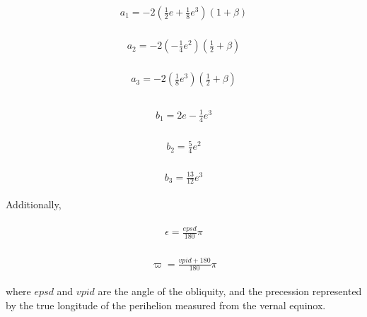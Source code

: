 \begin{eqnarray}
\begin{array}{l}
a_{1}=-2\left(\frac{1}{2} e+\frac{1}{8} e^{3}\right)(1+\beta)
\end{array}
\end{eqnarray}

\begin{eqnarray}
\begin{array}{l}
a_{2}=-2\left(-\frac{1}{4} e^{2}\right)\left(\frac{1}{2}+\beta\right)
\end{array}
\end{eqnarray}

\begin{eqnarray}
\begin{array}{l}
a_{3}=-2\left(\frac{1}{8} e^{3}\right)\left(\frac{1}{2}+\beta\right) \\
\end{array}
\end{eqnarray}

\begin{eqnarray}
\begin{array}{l}
b_{1}=2 e-\frac{1}{4} e^{3}
\end{array}
\end{eqnarray}

\begin{eqnarray}
\begin{array}{l}
b_{2}=\frac{5}{4} e^{2}
\end{array}
\end{eqnarray}

\begin{eqnarray}
\begin{array}{l}
b_{3}=\frac{13}{12} e^{3}
\end{array}
\end{eqnarray}

Additionally,

\begin{eqnarray}
\begin{array}{l}
\epsilon=\frac{e p s d}{180} \pi
\end{array}
\end{eqnarray}

\begin{eqnarray}
\begin{array}{l}
\varpi=\frac{v p i d+180}{180} \pi
\end{array}
\end{eqnarray}

where \(epsd\) and \(vpid\) are the angle of the obliquity, and the precession represented by the true longitude of the perihelion measured from the vernal equinox.

